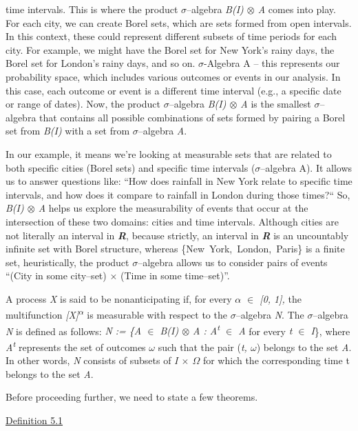 \documentclass[12pt,a4paper]{report}
\numberwithin{equation}{section}
\begin{document}
time intervals. This is where the product $\sigma$--algebra \emph{B(I) $\otimes$ A}
comes into play. For each city, we can create Borel sets, which are sets
formed from open intervals. In this context, these could represent
different subsets of time periods for each city. For example, we might
have the Borel set for New York's rainy days, the Borel set for London's
rainy days, and so on. $\sigma$-Algebra A -- this represents our probability
space, which includes various outcomes or events in our analysis. In
this case, each outcome or event is a different time interval (e.g., a
specific date or range of dates). Now, the product $\sigma$--algebra \emph{B(I)
$\otimes$ A} is the smallest $\sigma$--algebra that contains all possible combinations
of sets formed by pairing a Borel set from \emph{B(I)} with a set from
$\sigma$--algebra \emph{A}.

In our example, it means we're looking at measurable sets that are
related to both specific cities (Borel sets) and specific time intervals
($\sigma$--algebra A). It allows us to answer questions like: ``How does rainfall
in New York relate to specific time intervals, and how does it compare
to rainfall in London during those times?`` So, \emph{B(I) $\otimes$ A} helps us
explore the measurability of events that occur at the intersection of
these two domains: cities and time intervals. Although cities are not
literally an interval in \emph{\textbf{R}}, because strictly, an
interval in \emph{\textbf{R}} is an uncountably infinite set with Borel
structure, whereas \{New~York,~London,~Paris\} is a finite set,
heuristically, the product $\sigma$--algebra allows us to consider pairs of
events ``(City in some city--set) $\times$ (Time in some time--set)''.

A process \emph{X} is said to be nonanticipating if, for every \emph{$\alpha$ $\in$
{[}0, 1{]},} the multifunction \emph{{[}X{]}\textsuperscript{$\alpha$}} is
measurable with respect to the $\sigma$--algebra \emph{N}. The $\sigma$--algebra
\emph{N} is defined as follows: \emph{N := \{A $\in$ B(I) $\otimes$ A :
A\textsuperscript{t} $\in$ A} for every \emph{t $\in$ I}\}, where
\emph{A\textsuperscript{t}} represents the set of outcomes \emph{$\omega$} such
that the pair (\emph{t, $\omega$}) belongs to the set \emph{A}. In other words,
\emph{N} consists of subsets of \emph{I $\times$ $\Omega$} for which the corresponding
time t belongs to the set \emph{A}.

Before proceeding further, we need to state a few theorems.

\uline{Definition 5.1}
\end{document}
